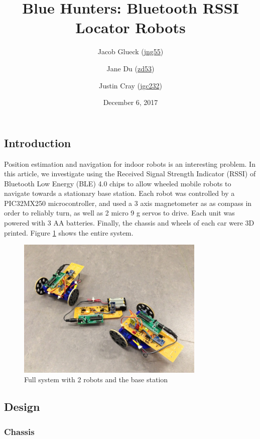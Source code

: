 \documentclass[]{article}
\title{Blue Hunters: Bluetooth RSSI Locator Robots}
\author{Jacob Glueck (\href{mailto:jng55@cornell.edu}{jng55}) \and Jane Du (\href{mailto:zd53@cornell.edu}{zd53}) \and Justin Cray (\href{mailto:jgc232@cornell.edu}{jgc232})}
\date{December 6, 2017}
\begin{document}
\maketitle

\hypertarget{introduction}{%
\subsection{Introduction}\label{introduction}}

Position estimation and navigation for indoor robots is an interesting problem.
In this article, we investigate using the Received Signal Strength Indicator (RSSI) of Bluetooth Low Energy (BLE) 4.0 chips to allow wheeled mobile robots to navigate towards a stationary base station.
Each robot was controlled by a PIC32MX250 microcontroller, and used a 3 axis magnetometer as as compass in order to reliably turn, as well as 2 micro 9 g servos to drive.
Each unit was powered with 3 AA batteries.
Finally, the chassis and wheels of each car were 3D printed.
Figure \ref{fig:robotsystem} shows the entire system.

\begin{figure}
  \centering
  \includegraphics[width=0.8\textwidth]{full_system.jpg}
  \caption{Full system with 2 robots and the base station}
  \label{fig:robotsystem}
\end{figure}

\hypertarget{design}{%
\subsection{Design}\label{design}}

\hypertarget{chassis}{%
\subsubsection{Chassis}\label{chassis}}
\end{document}
